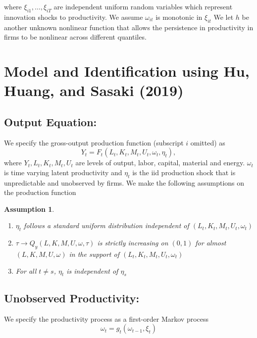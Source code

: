 \documentclass{article}
\newtheorem{assump}{Assumption}[subsection]
\begin{document}
where $\xi_{i1},\dots, \xi_{iT}$ are independent uniform random variables which represent innovation shocks to productivity. We assume $\omega_{it}$ is monotonic in $\xi_{it}$ We let $h$ be another unknown nonlinear function that allows the persistence in productivity in firms to be nonlinear across different quantiles.

\section{Model and Identification using Hu, Huang, and Sasaki (2019)}

\subsection{Output Equation:}

\noindent We specify the gross-output production function (subscript $i$ omitted) as
\begin{equation}\label{pf}
Y_{t}=F_{t}(L_{t}, K_{t}, M_{t}, U_{t}, \omega_{t}, \eta_{t}),
\end{equation}
where $Y_{t}, L_{t}, K_{t}, M_{t}, U_{t}$ are levels of output, labor, capital, material and energy. $\omega_{t}$ is time varying latent productivity and $\eta_{t}$ is the iid production shock that is unpredictable and unobserved by firms. We make the following assumptions on the production function\\

\begin{assump}\label{as1}
~
\begin{enumerate}[label=\alph*)]
\item $\eta_{t}$ follows a standard uniform distribution independent of $(L_{t}, K_{t}, M_{t}, U_{t}, \omega_{t})$
\item $\tau \rightarrow Q_{y}(L, K, M, U,\omega, \tau)$ is strictly increasing on $(0,1)$ for almost $(L, K, M, U,\omega)$ in the support of $(L_{t}, K_{t}, M_{t}, U_{t}, \omega_{t})$
\item For all $t\neq s$, $\eta_{t}$ is independent of $\eta_{s}$
\end{enumerate}
\end{assump}


\subsection{Unobserved Productivity:}

\noindent We specify the productivity process as a first-order Markov process
\begin{equation}\label{markov}
	\omega_{t}=g_{t}(\omega_{t-1}, \xi_{t})
\end{equation}
\end{document}
